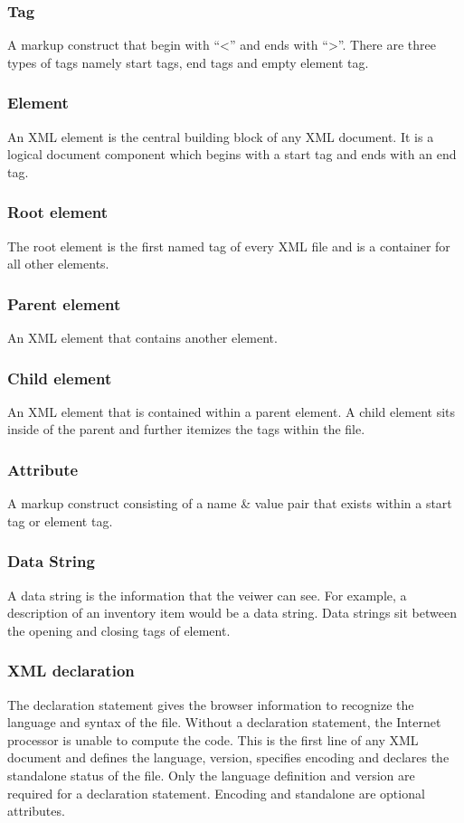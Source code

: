 \documentclass[journal]{IEEEtran}
\begin{document}
\subsubsection{Tag}
 A markup construct that begin with ``<” and ends with ``>”. There are three types of tags namely start tags, end tags and empty element tag.

\subsubsection{Element}
An XML element is the central building block of any XML document. It is a logical document component which begins with a start tag and ends with an end tag.

\subsubsection{Root element}
The root element is the first named tag of every XML file and is a container for all other elements.

\subsubsection{Parent element}
An XML element that contains another element.

\subsubsection{Child element}
 An XML element that is contained within a parent element. A child element sits inside of the parent and further itemizes the tags within the file.
 
 \subsubsection{Attribute}
  A markup construct consisting of a name \& value pair that exists within a start tag
or element tag.

\subsubsection{Data String}
 A data string is the information that the veiwer can see. For example, a description of an inventory item would be a data string. Data strings sit between the opening and
closing tags of element.

\subsubsection{XML declaration}
The declaration statement gives the browser information to recognize
the language and syntax of the file. Without a declaration statement, the Internet processor
is unable to compute the code. This is the first line of any XML document and defines the
language, version, specifies encoding and declares the standalone status of the file. Only
the language definition and version are required for a declaration statement. Encoding and
standalone are optional attributes.
\end{document}
